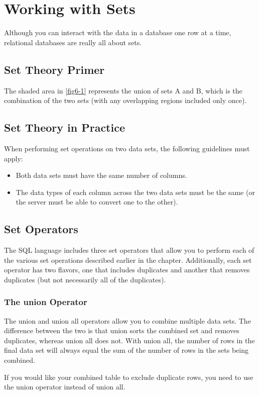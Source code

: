 \chapter{Working with Sets\label{Ch06}}
Although you can interact with the data in a database one row at a time, relational databases are really all about sets.
\section{Set Theory Primer}
The shaded area in \autoref{fig6-1} represents the union of sets A and B, which is the combination of the two sets (with any overlapping regions included only once).

\section{Set Theory in Practice}
When performing set operations on two data sets, the following guidelines must apply:
\begin{itemize}
    \item Both data sets must have the same number of columns.
    \item The data types of each column across the two data sets must be the same (or the server must be able to convert one to the other).
\end{itemize}
\section{Set Operators}
The SQL language includes three set operators that allow you to perform each of the various set operations described earlier in the chapter. Additionally, each set operator has two flavors, one that includes duplicates and another that removes duplicates (but not necessarily all of the duplicates).

\subsection{The union Operator}
The union and union all operators allow you to combine multiple data sets. The difference between the two is that union sorts the combined set and removes duplicates, whereas union all does not. With union all, the number of rows in the final data set will always equal the sum of the number of rows in the sets being combined.

If you would like your combined table to exclude duplicate rows, you need to use the union operator instead of union all.

